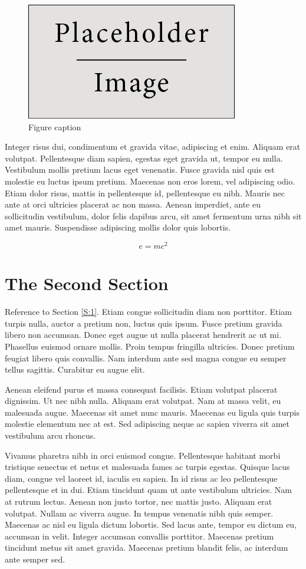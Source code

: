 \documentclass[preprint,12pt]{elsarticle}
\begin{document}
\begin{figure}[h]
\centering\includegraphics[width=0.4\linewidth]{placeholder}
\caption{Figure caption}
\end{figure}

Integer risus dui, condimentum et gravida vitae, adipiscing et enim. Aliquam erat volutpat. Pellentesque diam sapien, egestas eget gravida ut, tempor eu nulla. Vestibulum mollis pretium lacus eget venenatis. Fusce gravida nisl quis est molestie eu luctus ipsum pretium. Maecenas non eros lorem, vel adipiscing odio. Etiam dolor risus, mattis in pellentesque id, pellentesque eu nibh. Mauris nec ante at orci ultricies placerat ac non massa. Aenean imperdiet, ante eu sollicitudin vestibulum, dolor felis dapibus arcu, sit amet fermentum urna nibh sit amet mauris. Suspendisse adipiscing mollis dolor quis lobortis.

\begin{equation}
\label{eq:emc}
e = mc^2
\end{equation}

\section{The Second Section}
\label{S:2}

Reference to Section \ref{S:1}. Etiam congue sollicitudin diam non porttitor. Etiam turpis nulla, auctor a pretium non, luctus quis ipsum. Fusce pretium gravida libero non accumsan. Donec eget augue ut nulla placerat hendrerit ac ut mi. Phasellus euismod ornare mollis. Proin tempus fringilla ultricies. Donec pretium feugiat libero quis convallis. Nam interdum ante sed magna congue eu semper tellus sagittis. Curabitur eu augue elit.

Aenean eleifend purus et massa consequat facilisis. Etiam volutpat placerat dignissim. Ut nec nibh nulla. Aliquam erat volutpat. Nam at massa velit, eu malesuada augue. Maecenas sit amet nunc mauris. Maecenas eu ligula quis turpis molestie elementum nec at est. Sed adipiscing neque ac sapien viverra sit amet vestibulum arcu rhoncus.

Vivamus pharetra nibh in orci euismod congue. Pellentesque habitant morbi tristique senectus et netus et malesuada fames ac turpis egestas. Quisque lacus diam, congue vel laoreet id, iaculis eu sapien. In id risus ac leo pellentesque pellentesque et in dui. Etiam tincidunt quam ut ante vestibulum ultricies. Nam at rutrum lectus. Aenean non justo tortor, nec mattis justo. Aliquam erat volutpat. Nullam ac viverra augue. In tempus venenatis nibh quis semper. Maecenas ac nisl eu ligula dictum lobortis. Sed lacus ante, tempor eu dictum eu, accumsan in velit. Integer accumsan convallis porttitor. Maecenas pretium tincidunt metus sit amet gravida. Maecenas pretium blandit felis, ac interdum ante semper sed.
\end{document}
